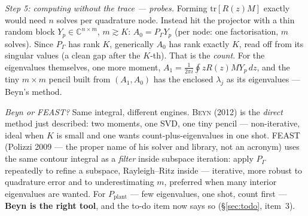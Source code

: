 \documentclass[11pt,a4paper]{article}
\newcommand{\C}{\mathbb{C}}
\begin{document}
{\emph{Step 5: computing without the trace --- probes.}  Forming $\mathrm{tr}[R(z)M]$
exactly would need $n$ solves per quadrature node.  Instead hit the projector with a thin
random block $Y_{\!p}\in\C^{n\times m}$, $m\gtrsim K$:
$A_0=P_\Gamma Y_{\!p}$ (per node: one factorisation, $m$ solves).  Since $P_\Gamma$ has
rank $K$, generically $A_0$ has rank exactly $K$, read off from its singular values (a
clean gap after the $K$-th).  That is the \emph{count}.  For the eigenvalues themselves,
one more moment, $A_1=\tfrac1{2\pi i}\oint zR(z)MY_{\!p}\,dz$, and the tiny $m\times m$
pencil built from $(A_1,A_0)$ has the enclosed $\lambda_j$ as its eigenvalues --- Beyn's
method.

\emph{Beyn or FEAST?}  Same integral, different engines.  \textsc{Beyn} (2012) is the
\emph{direct} method just described: two moments, one SVD, one tiny pencil ---
non-iterative, ideal when $K$ is small and one wants count-plus-eigenvalues in one shot.
\textsc{FEAST} (Polizzi 2009 --- the proper name of his solver and library, not an
acronym) uses the same contour integral as a \emph{filter} inside subspace iteration:
apply $P_\Gamma$ repeatedly to refine a subspace, Rayleigh--Ritz inside --- iterative,
more robust to quadrature error and to underestimating $m$, preferred when many interior
eigenvalues are wanted.  For $P_{\mathrm{plant}}$ --- few eigenvalues, one shot, count
first --- \textbf{Beyn is the right tool}, and the to-do item now says so
(\S\ref{sec:todo}, item~3).


}
\end{document}
